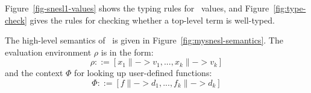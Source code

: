  
Figure~\ref{fig-snesl1-values} shows the typing rules for \mysnesl \ values, and Figure~\ref{fig:type-check} gives the rules for checking whether a top-level term is well-typed.




\hspace{1cm}

The high-level semantics of \mysnesl \ is given in Figure~\ref{fig:mysnesl-semantics}. The evaluation environment  $\rho$ is in the form: $$ \rho ::= [x_1 \|-> v_1,...,x_k \|-> v_k]$$ and the context $\Phi$ for looking up user-defined functions: $$\Phi ::= [f \|-> d_1,..., f_k\|-> d_k]$$


